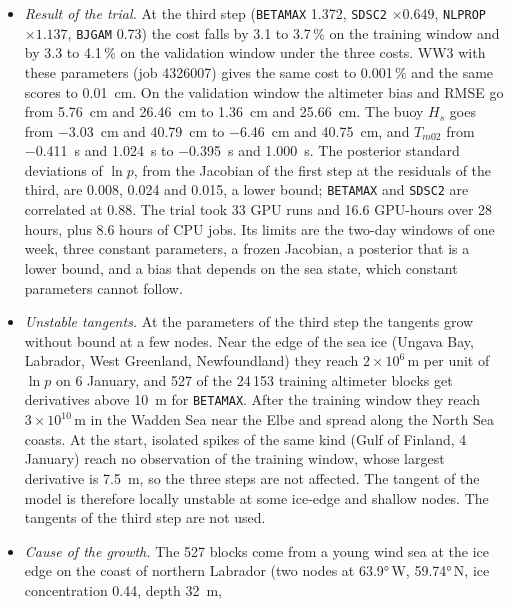 \documentclass[11pt,a4paper]{article}
\begin{document}
\begin{itemize}
4332611 to 4332617) give the Jacobian of the test. Binned by the wind at
the observation, the bias at 20 to \SI{30}{m/s} is \SI{+19}{cm} for the
altimeters and \SI{-22}{cm} for the buoys at the start, so the test has
to arbitrate between them.
\item \emph{Result of the trial.} At the third step (\texttt{BETAMAX}
1.372, \texttt{SDSC2} $\times0.649$, \texttt{NLPROP} $\times1.137$,
\texttt{BJGAM} 0.73) the cost falls by 3.1 to 3.7\,\% on the training
window and by 3.3 to 4.1\,\% on the validation window under the three
costs. WW3 with these parameters (job 4326007) gives the same cost to
0.001\,\% and the same scores to \SI{0.01}{cm}. On the validation window
the altimeter bias and RMSE go from \SI{+5.76}{cm} and \SI{26.46}{cm} to
\SI{+1.36}{cm} and \SI{25.66}{cm}. The buoy $H_s$ goes from \SI{-3.03}{cm}
and \SI{40.79}{cm} to \SI{-6.46}{cm} and \SI{40.75}{cm}, and $T_{m02}$
from \SI{-0.411}{s} and \SI{1.024}{s} to \SI{-0.395}{s} and
\SI{1.000}{s}. The posterior standard deviations of $\ln p$, from the
Jacobian of the first step at the residuals of the third, are 0.008, 0.024
and 0.015, a lower bound; \texttt{BETAMAX} and \texttt{SDSC2} are
correlated at 0.88. The trial took 33 GPU runs and 16.6 GPU-hours over
28 hours, plus 8.6 hours of CPU jobs. Its limits are the two-day windows
of one week, three constant parameters, a frozen Jacobian, a posterior
that is a lower bound, and a bias that depends on the sea state, which
constant parameters cannot follow.
\item \emph{Unstable tangents.} At the parameters of the third step the
tangents grow without bound at a few nodes. Near the edge of the sea ice
(Ungava Bay, Labrador, West Greenland, Newfoundland) they reach
$2\times10^6$\,m per unit of $\ln p$ on 6 January, and 527 of the 24\,153
training altimeter blocks get derivatives above \SI{10}{m} for
\texttt{BETAMAX}. After the training window they reach
$3\times10^{10}$\,m in the Wadden Sea near the Elbe and spread along the
North Sea coasts. At the start, isolated spikes of the same kind (Gulf of
Finland, 4 January) reach no observation of the training window, whose
largest derivative is \SI{7.5}{m}, so the three steps are not affected.
The tangent of the model is therefore locally unstable at some ice-edge
and shallow nodes. The tangents of the third step are not used.
\item \emph{Cause of the growth.} The 527 blocks come from a young wind
sea at the ice edge on the coast of northern Labrador (two nodes at
\ang{63.9}\,W, \ang{59.74}\,N, ice concentration 0.44, depth \SI{32}{m},

\end{itemize}
\end{document}
